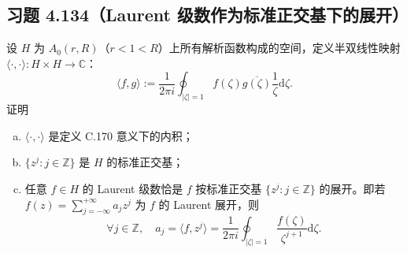 \documentclass[11pt,a4paper]{article}
\newcommand{\C}{\mathbb{C}}
\newcommand{\Z}{\mathbb{Z}}
\newcommand{\dd}{\mathrm{d}}
\theoremstyle{definition}
\begin{document}
\subsection{习题 4.134（Laurent 级数作为标准正交基下的展开）}

设 $H$ 为 $A_0(r, R)$（$r < 1 < R$）上所有解析函数构成的空间，定义半双线性映射 $\langle\cdot, \cdot\rangle : H \times H \to \C$：
\[
  \langle f, g \rangle := \frac{1}{2\pi i}
  \oint_{|\zeta| = 1} f(\zeta) \overline{g(\zeta)} \frac{1}{\zeta} \dd\zeta.
\]
证明
\begin{enumerate}[(a)]
  \item $\langle\cdot, \cdot\rangle$ 是定义 C.170 意义下的内积；
  \item $\{z^j : j \in \Z\}$ 是 $H$ 的标准正交基；
  \item 任意 $f \in H$ 的 Laurent 级数恰是 $f$ 按标准正交基 $\{z^j : j \in \Z\}$ 的展开。即若 $f(z) = \sum_{j=-\infty}^{+\infty} a_j z^j$ 为 $f$ 的 Laurent 展开，则
    \[
      \forall j \in \Z, \quad a_j = \langle f, z^j \rangle
      = \frac{1}{2\pi i} \oint_{|\zeta|=1} \frac{f(\zeta)}{\zeta^{j+1}} \dd\zeta.
    \]
\end{enumerate}
\end{document}
